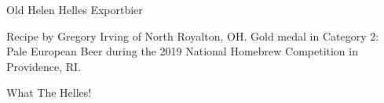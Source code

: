 \begin{recipe}{Old Helen Helles Exportbier} %

\begin{aboutblock}
Recipe by Gregory Irving of North Royalton, OH. Gold medal in Category 2: Pale
European Beer during the 2019 National Homebrew Competition in Providence, RI.
\sourceaha
\end{aboutblock}


\begin{methodandtiming}
 
\begin{mashsteps}
\end{mashsteps}

\begin{fermentationsteps}
\end{fermentationsteps}

\end{methodandtiming}

\recipebreak

\begin{ingredientsblock}

\begin{malts}
\end{malts}

\begin{hops}
\end{hops}


\end{ingredientsblock}

\begin{recipe}{What The Helles!} %


\end{recipe}
\end{recipe}
